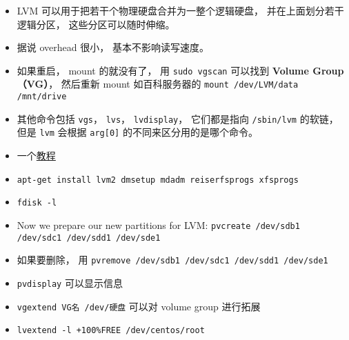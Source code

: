 
\begin{issues}
\issueDraft
\end{issues}


\begin{itemize}
\item LVM 可以用于把若干个物理硬盘合并为一整个逻辑硬盘， 并在上面划分若干逻辑分区， 这些分区可以随时伸缩。
\item 据说 overhead 很小， 基本不影响读写速度。
\item 如果重启， mount 的就没有了， 用 \verb`sudo vgscan` 可以找到 \textbf{Volume Group（VG）}， 然后重新 mount 如百科服务器的 \verb`mount /dev/LVM/data /mnt/drive`
\item 其他命令包括 \verb|vgs|， \verb|lvs|， \verb|lvdisplay|， 它们都是指向 \verb|/sbin/lvm| 的软链， 但是 \verb|lvm| 会根据 \verb|arg[0]| 的不同来区分用的是哪个命令。
\end{itemize}

\begin{itemize}
\item 一个\href{https://www.howtoforge.com/linux_lvm}{教程}
\item \verb|apt-get install lvm2 dmsetup mdadm reiserfsprogs xfsprogs|
\item \verb|fdisk -l|
\item Now we prepare our new partitions for LVM: \verb|pvcreate /dev/sdb1 /dev/sdc1 /dev/sdd1 /dev/sde1|
\item 如果要删除， 用 \verb|pvremove /dev/sdb1 /dev/sdc1 /dev/sdd1 /dev/sde1|
\item \verb|pvdisplay| 可以显示信息
\item \verb|vgextend VG名 /dev/硬盘| 可以对 volume group 进行拓展
\item \verb|lvextend -l +100%FREE /dev/centos/root|
\end{itemize}
